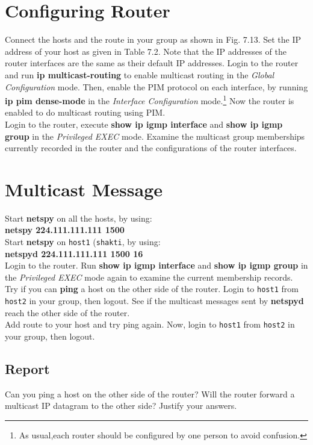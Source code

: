 \documentclass[10pt,a4paper]{article}
\numberwithin{equation}{section}
\numberwithin{figure}{section}
\numberwithin{table}{section}
\begin{document}
\section{Configuring Router}
    Connect the hosts and the route in your group as shown in Fig. 7.13. Set the IP address of your host as given in Table 7.2. Note that the IP addresses of the router interfaces are the same as their default IP addresses.
    Login to the router and run \textbf{ip multicast-routing} to enable multicast routing in the \textit{Global Configuration} mode.
    Then, enable the PIM protocol on each interface, by running \textbf{ip pim dense-mode} in the \textit{Interface Configuration} mode.\footnote{As usual,each router should be configured by one person to avoid confusion.} Now the router is enabled to do multicast routing using PIM. \\
    Login to the router, execute \textbf{show ip igmp interface} and \textbf{show ip igmp group} in the \textit{Privileged EXEC} mode.
    Examine the multicast group memberships currently recorded in the router and the configurations of the router interfaces.

\section{Multicast Message}
    Start \textbf{netspy} on all the hosts, by using: \\
    \textbf{netspy 224.111.111.111 1500} \\
    Start \textbf{netspy} on \texttt{host1} (\texttt{shakti}, by using: \\
    \textbf{netspyd 224.111.111.111 1500 16} \\
    Login to the router.
    Run \textbf{show ip igmp interface} and \textbf{show ip igmp group} in the \textit{Privileged EXEC} mode again to examine the current membership records. \\
    Try if you can \textbf{ping} a host on the other side of the router.
    Login to \texttt{host1} from \texttt{host2} in your group, then logout.
    See if the multicast messages sent by \textbf{netspyd} reach the other side of the router.\\
    Add route to your host and try ping again. Now, login to \texttt{host1} from \texttt{host2} in your group, then logout.
    \subsection*{Report}
    Can you ping a host on the other side of the router?
    Will the router forward a multicast IP datagram to the other side?
    Justify your answers.
\end{document}
